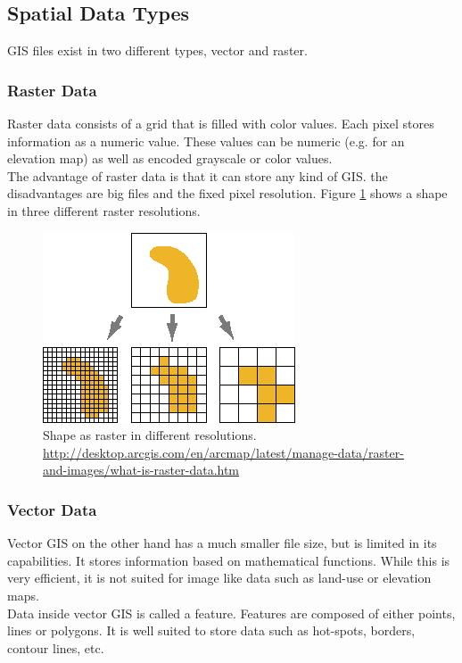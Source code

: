 \subsection{Spatial Data Types}
GIS files exist in two different types, vector and raster.

\subsubsection{Raster Data}
 Raster data consists of a grid that is filled with color values. Each pixel stores information as a numeric value. These values can be numeric (e.g. for an elevation map) as well as encoded grayscale or color values.\\
 The advantage of raster data is that it can store any kind of GIS. the disadvantages are big files and the fixed pixel resolution. Figure \ref{fig:vector-raster} shows a shape in three different raster resolutions.
 
 \begin{figure}[H]
 	\centering\includegraphics[width=.5\textwidth]{res/Vector-Raster}
 	\caption{Shape as raster in different resolutions. \url{http://desktop.arcgis.com/en/arcmap/latest/manage-data/raster-and-images/what-is-raster-data.htm}}
 	\label{fig:vector-raster}
 \end{figure}

\subsubsection{Vector Data}
Vector GIS on the other hand has a much smaller file size, but is limited in its capabilities. It stores information based on mathematical functions. While this is very efficient, it is not suited for image like data such as land-use or elevation maps.\\
Data inside vector GIS is called a feature. Features are composed of either points, lines or polygons. It is well suited to store data such as hot-spots, borders, contour lines, etc. 



%
%
%
